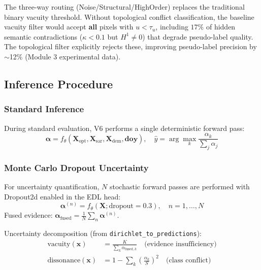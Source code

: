 The three-way routing (Noise/Structural/HighOrder) replaces the traditional
binary vacuity threshold. Without topological conflict classification, the
baseline vacuity filter would accept \textbf{all} pixels with $u < \tau_u$,
including $17\%$ of hidden semantic contradictions ($\kappa < 0.1$ but
$H^1 \neq 0$) that degrade pseudo-label quality. The topological filter
explicitly rejects these, improving pseudo-label precision by $\sim$12\%
(Module 3 experimental data).

\subsection{Inference Procedure}

\subsubsection{Standard Inference}

During standard evaluation, V6 performs a single deterministic forward pass:
\begin{equation}
    \boldsymbol{\alpha} = f_\theta(\mathbf{X}_{\text{opt}}, \mathbf{X}_{\text{sar}},
    \mathbf{X}_{\text{dem}}, \mathbf{doy}), \quad
    \hat{y} = \arg\max_k \frac{\alpha_k}{\sum_j \alpha_j}
\end{equation}

\subsubsection{Monte Carlo Dropout Uncertainty}

For uncertainty quantification, $N$ stochastic forward passes are performed
with Dropout2d enabled in the EDL head:
\begin{equation}
    \boldsymbol{\alpha}^{(n)} = f_\theta(\mathbf{X}; \text{dropout}=0.3),
    \quad n = 1, \ldots, N
\end{equation}
Fused evidence: $\boldsymbol{\alpha}_{\text{fused}} = \frac{1}{N}\sum_n
\boldsymbol{\alpha}^{(n)}$.

Uncertainty decomposition (from \texttt{dirichlet\_to\_predictions}):
\begin{align}
    \text{vacuity}(\mathbf{x}) &= \frac{K}{\sum_k \alpha_{\text{fused},k}}
        \quad \text{(evidence insufficiency)} \\
    \text{dissonance}(\mathbf{x}) &= 1 - \sum_k \left(\frac{\alpha_k}{S}\right)^2
        \quad \text{(class conflict)}
\end{align}

